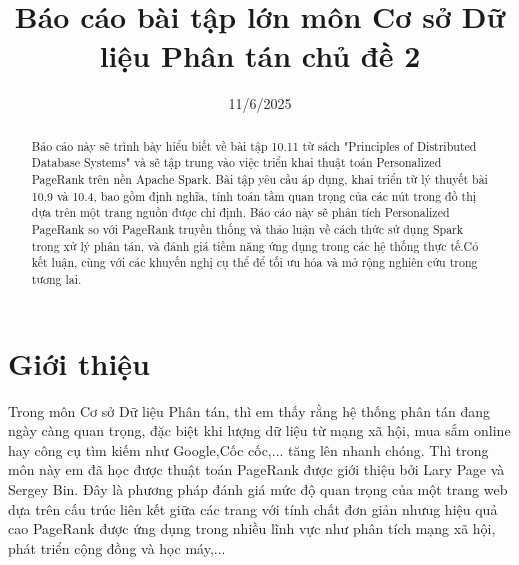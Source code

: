 \documentclass[conference]{IEEEtran}
\begin{document}
\title{Báo cáo bài tập lớn môn Cơ sở Dữ liệu Phân tán chủ đề 2}

\author{
}
\date{11/6/2025}

\maketitle

\begin{abstract}
Báo cáo này sẽ trình bày hiểu biết về bài tập 10.11 từ sách "Principles of Distributed Database Systems" và sẽ tập trung vào việc triển khai thuật toán Personalized PageRank trên nền Apache Spark. Bài tập yêu cầu áp dụng, khai triển từ lý thuyết bài 10.9 và 10.4, bao gồm định nghĩa, tính toán tầm quan trọng của các nút trong đồ thị dựa trên một trang nguồn được chỉ định. Báo cáo này sẽ phân tích Personalized PageRank so với PageRank truyền thống và thảo luận về cách thức sử dụng Spark trong xử lý phân tán, và đánh giá tiềm năng ứng dụng trong các hệ thống thực tế.Có kết luận, cùng với các khuyến nghị cụ thể để tối ưu hóa và mở rộng nghiên cứu trong tương lai.
\end{abstract}

\section{Giới thiệu}
Trong môn Cơ sở Dữ liệu Phân tán, thì em thấy rằng hệ thống phân tán đang ngày càng quan trọng, đặc biệt khi lượng dữ liệu từ mạng xã hội, mua sắm online hay công cụ tìm kiếm như Google,Cốc cốc,... tăng lên nhanh chóng. Thì trong môn này em đã học được thuật toán PageRank được giới thiệu bởi Lary Page và Sergey Bin. Đây là phương pháp đánh giá mức độ quan trọng của một trang web dựa trên cấu trúc liên kết giữa các trang với tính chất đơn giản nhưug hiệu quả cao PageRank được ứng dụng trong nhiều lĩnh vực như phân tích mạng xã hội, phát triển cộng đồng và học máy,...
\\
\end{document}
